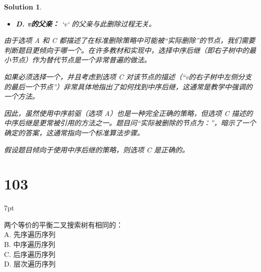 \documentclass[UTF8]{report}
\newtheorem{solution}{Solution}
\theoremstyle{MyLineTheoremStyle} %
\theoremstyle{MyBlockTheoremStyle} %
\theoremstyle{MySubsubsectionStyle} %
\newenvironment{graybox}{%
        \def\FrameCommand{%
        \hspace{1pt}%
        {\color{gray}\small \vrule width 2pt}%
        {\color{graybox_color}\vrule width 4pt}%
        \colorbox{graybox_color}%
        }%
        \MakeFramed{\advance\hsize-\width\FrameRestore}%
        \noindent\hspace{-4.55pt}%
        \begin{adjustwidth}{}{7pt}%
        \vspace{2pt}\vspace{2pt}%
        }
        {%
        \vspace{2pt}\end{adjustwidth}\endMakeFramed%
        }
\begin{document}
\begin{solution}
\begin{itemize}
    \item \textbf{D. v的父亲：}
        `v` 的父亲与此删除过程无关。
\end{itemize}

由于选项 A 和 C 都描述了在标准删除策略中可能被“实际删除”的节点，我们需要判断题目更倾向于哪一个。在许多教材和实现中，选择中序后继（即右子树中的最小节点）作为替代节点是一个非常普遍的做法。

如果必须选择一个，并且考虑到选项 C 对该节点的描述（“v的右子树中左侧分支的最后一个节点”）非常具体地指出了如何找到中序后继，这通常是教学中强调的一个方法。

因此，虽然使用中序前驱（选项 A）也是一种完全正确的策略，但选项 C 描述的中序后继是更常被引用的方法之一。题目问“实际被删除的节点为：”，暗示了一个确定的答案，这通常指向一个标准算法步骤。

假设题目倾向于使用中序后继的策略，则选项 C 是正确的。
\end{solution}


\section*{103}
\begin{graybox}
两个等价的平衡二叉搜索树有相同的： \\
A. 先序遍历序列 \\
B. 中序遍历序列 \\
C. 后序遍历序列 \\
D. 层次遍历序列
\end{graybox}
\end{document}
